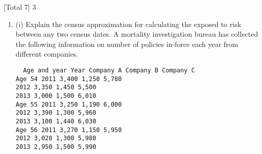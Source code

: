 \documentclass[a4paper,12pt]{article}
\begin{document}
\begin{enumerate}


[Total 7]
3 
\begin{enumerate}
\item (i) Explain the census approximation for calculating the exposed to risk between
any two census dates. 
A mortality investigation bureau has collected the following information on number
of policies in-force each year from different companies.
\begin{verbatim}
  Age and year Year Company A Company B Company C
Age 54 2011 3,400 1,250 5,780
2012 3,350 1,450 5,500
2013 3,000 1,500 6,010
Age 55 2011 3,250 1,190 6,000
2012 3,390 1,300 5,960
2013 3,100 1,440 6,030
Age 56 2011 3,270 1,150 5,950
2012 3,020 1,300 5,980
2013 2,950 1,500 5,990  
\end{verbatim}


\end{enumerate}
\end{enumerate}
\end{document}
